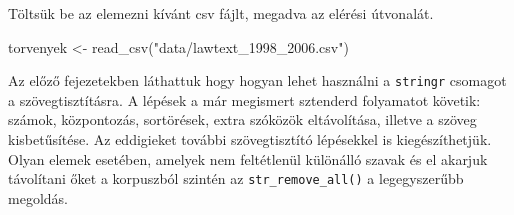 \documentclass[
]{book}
\newenvironment{Shaded}{\begin{snugshade}}{\end{snugshade}}
\newcommand{\FunctionTok}[1]{\textcolor[rgb]{0.00,0.00,0.00}{#1}}
\newcommand{\NormalTok}[1]{#1}
\newcommand{\OtherTok}[1]{\textcolor[rgb]{0.56,0.35,0.01}{#1}}
\newcommand{\StringTok}[1]{\textcolor[rgb]{0.31,0.60,0.02}{#1}}
\begin{document}
Töltsük be az elemezni kívánt csv fájlt, megadva az elérési útvonalát.

\begin{Shaded}
\begin{Highlighting}[]
\NormalTok{torvenyek }\OtherTok{\textless{}{-}} \FunctionTok{read\_csv}\NormalTok{(}\StringTok{"data/lawtext\_1998\_2006.csv"}\NormalTok{)}
\end{Highlighting}
\end{Shaded}

Az előző fejezetekben láthattuk hogy hogyan lehet használni a
\texttt{stringr} csomagot a szövegtisztításra. A lépések a már megismert
sztenderd folyamatot követik: számok, központozás, sortörések, extra
szóközök eltávolítása, illetve a szöveg kisbetűsítése. Az eddigieket
további szövegtisztító lépésekkel is kiegészíthetjük. Olyan elemek
esetében, amelyek nem feltétlenül különálló szavak és el akarjuk
távolítani őket a korpuszból szintén az \texttt{str\_remove\_all()} a
legegyszerűbb megoldás.
\end{document}
